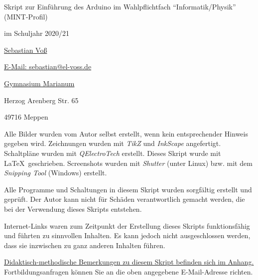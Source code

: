 









\thispagestyle{empty}
\clearpage

\vspace{2\baselineskip}
Skript zur Einführung des Arduino im Wahlpflichtfach \enquote{Informatik/Physik} (MINT-Profil)

im Schuljahr 2020/21

\href{https://www.el-voss.de/}{Sebastian Voß}

\href{mailto:sebastian@el-voss.de}{E-Mail: sebastian@el-voss.de}

\vspace{2\baselineskip}

\href{http://marianum-meppen.de/}{Gymnasium Marianum}

Herzog Arenberg Str. 65

49716 Meppen

\vspace{2\baselineskip}

Alle Bilder wurden vom Autor selbst erstellt, wenn kein entsprechender Hinweis gegeben wird. Zeichnungen wurden mit \emph{TikZ} und \emph{InkScape} angefertigt. Schaltpläne wurden mit \emph{QElectroTech} erstellt. Dieses Skript wurde mit \LaTeX ~geschrieben. Screenshots wurden mit \emph{Shutter} (unter Linux) bzw. mit dem \emph{Snipping Tool} (Windows) erstellt. 

\vspace{\baselineskip}
Alle Programme und Schaltungen in diesem Skript wurden sorgfältig erstellt und geprüft. Der Autor kann nicht für Schäden verantwortlich gemacht werden, die bei der Verwendung dieses Skripts entstehen.

\vspace{\baselineskip}
Internet-Links waren zum Zeitpunkt der Erstellung dieses Skripts funktionsfähig und führten zu sinnvollen Inhalten. Es kann jedoch nicht ausgeschlossen werden, dass sie inzwischen zu ganz anderen Inhalten führen.
\vspace{2\baselineskip}

\hyperref[kap:didaktik]{Didaktisch-methodische Bemerkungen zu diesem Skript befinden sich im Anhang.} Fortbildungsanfragen können Sie an die oben angegebene E-Mail-Adresse richten.
\vspace{14\baselineskip}


